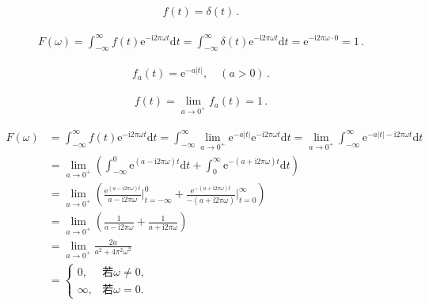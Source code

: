 \begin{align}
    f(t)=\delta(t)\, .
\end{align}

\begin{align}
    F(\omega)=\int_{-\infty}^{\infty}f(t)\mathrm{e}^{-\mathrm{i}2\pi\omega t}\mathrm{d}t
    =\int_{-\infty}^{\infty}\delta(t)\mathrm{e}^{-\mathrm{i}2\pi\omega t}\mathrm{d}t
    =\mathrm{e}^{-\mathrm{i}2\pi\omega\cdot0}
    =1\, .
\end{align}

\begin{align}
    f_a(t)=\mathrm{e}^{-a|t|},\quad (a>0)\, .
\end{align}

\begin{align}
    f(t)=\lim\limits_{a\rightarrow0^+}f_a(t)=1\, .
\end{align}

\begin{align}
    F(\omega) & =\int_{-\infty}^{\infty}f(t)\mathrm{e}^{-\mathrm{i}2\pi\omega t}\mathrm{d}t
    =\int_{-\infty}^{\infty}\lim\limits_{a\rightarrow0^+}\mathrm{e}^{-a|t|}\mathrm{e}^{-\mathrm{i}2\pi\omega t}\mathrm{d}t
    =\lim\limits_{a\rightarrow0^+}\int_{-\infty}^{\infty}\mathrm{e}^{-a|t|-\mathrm{i}2\pi\omega t}\mathrm{d}t\nonumber                                                                                  \\
              & =\lim\limits_{a\rightarrow0^+}\left(\int_{-\infty}^0\mathrm{e}^{(a-\mathrm{i}2\pi\omega)t}\mathrm{d}t+\int_0^{\infty}\mathrm{e}^{-(a+\mathrm{i}2\pi\omega)t}\mathrm{d}t\right)\nonumber \\
              & =\lim\limits_{a\rightarrow0^+}\left(\frac{\mathrm{e}^{(a-\mathrm{i}2\pi\omega)t}}{a-\mathrm{i}2\pi\omega}\bigg|_{t=-\infty}^0
    +\frac{\mathrm{e}^{-(a+\mathrm{i}2\pi\omega)t}}{-(a+\mathrm{i}2\pi\omega)}\bigg|_{t=0}^{\infty}\right)\nonumber                                                                                     \\
              & =\lim\limits_{a\rightarrow0^+}\left(\frac{1}{a-\mathrm{i}2\pi\omega}+\frac{1}{a+\mathrm{i}2\pi\omega}\right)\nonumber                                                                   \\
              & =\lim\limits_{a\rightarrow0^+}\frac{2a}{a^2+4\pi^2\omega^2}\nonumber                                                                                                                    \\
              & =\left\{\begin{array}{ll}
        0,      & \text{若}\omega\neq0, \\
        \infty, & \text{若}\omega=0.
    \end{array}\right.
\end{align}

